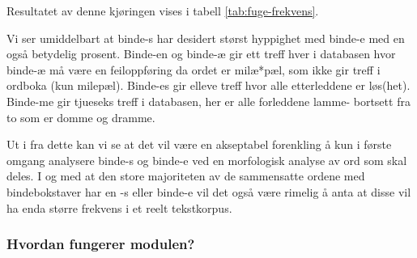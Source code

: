 Resultatet av denne kjøringen vises i tabell \ref{tab:fuge-frekvens}.


Vi ser umiddelbart at binde-s har desidert størst hyppighet med binde-e med en også betydelig prosent. Binde-en og binde-æ gir ett treff hver i databasen hvor binde-æ må være en feiloppføring da ordet er milæ*pæl, som ikke gir treff i ordboka (kun milepæl). Binde-es gir elleve treff hvor alle etterleddene er løs(het). Binde-me gir tjueseks treff i databasen, her er alle forleddene lamme- bortsett fra to som er domme og dramme.

Ut i fra dette kan vi se at det vil være en akseptabel forenkling å kun i første omgang analysere binde-s og binde-e ved en morfologisk analyse av ord som skal deles. I og med at den store majoriteten av de sammensatte ordene med bindebokstaver har en -s eller binde-e vil det også være rimelig å anta at disse vil ha enda større frekvens i et reelt tekstkorpus.

\begin{center}
{\huge\color{gray!50}{\decofourleft}}
\end{center}

\subsubsection{Hvordan fungerer modulen?}

